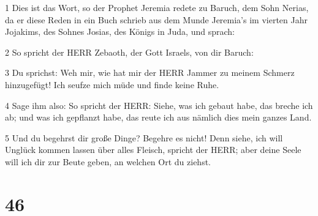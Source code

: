 \par 1 Dies ist das Wort, so der Prophet Jeremia redete zu Baruch, dem Sohn Nerias, da er diese Reden in ein Buch schrieb aus dem Munde Jeremia's im vierten Jahr Jojakims, des Sohnes Josias, des Königs in Juda, und sprach:
\par 2 So spricht der HERR Zebaoth, der Gott Israels, von dir Baruch:
\par 3 Du sprichst: Weh mir, wie hat mir der HERR Jammer zu meinem Schmerz hinzugefügt! Ich seufze mich müde und finde keine Ruhe.
\par 4 Sage ihm also: So spricht der HERR: Siehe, was ich gebaut habe, das breche ich ab; und was ich gepflanzt habe, das reute ich aus nämlich dies mein ganzes Land.
\par 5 Und du begehrst dir große Dinge? Begehre es nicht! Denn siehe, ich will Unglück kommen lassen über alles Fleisch, spricht der HERR; aber deine Seele will ich dir zur Beute geben, an welchen Ort du ziehst.

\chapter{46}

